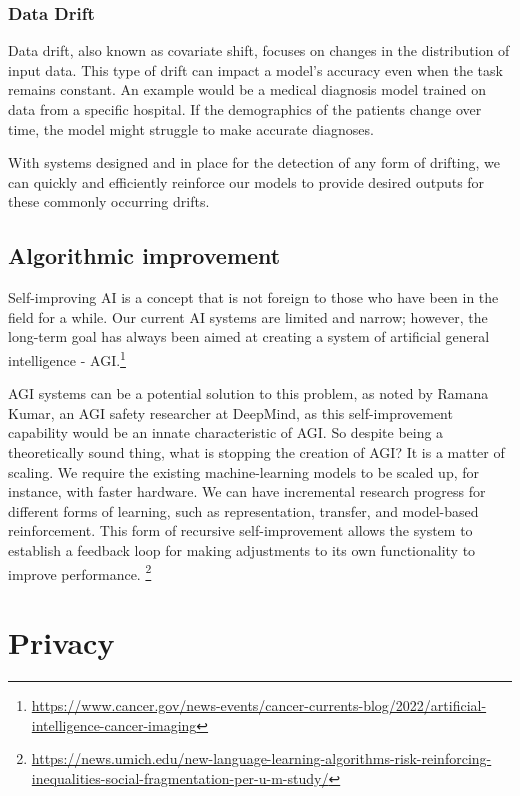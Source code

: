 \documentclass[
]{book}
\begin{document}
\hypertarget{data-drift}{%
\subsection{Data Drift}\label{data-drift}}

Data drift, also known as covariate shift, focuses on changes in the distribution of input data. This type of drift can impact a model's accuracy even when the task remains constant. An example would be a medical diagnosis model trained on data from a specific hospital. If the demographics of the patients change over time, the model might struggle to make accurate diagnoses.

With systems designed and in place for the detection of any form of drifting, we can quickly and efficiently reinforce our models to provide desired outputs for these commonly occurring drifts.

\hypertarget{algorithmic-improvement}{%
\section{Algorithmic improvement}\label{algorithmic-improvement}}

Self-improving AI is a concept that is not foreign to those who have been in the field for a while. Our current AI systems are limited and narrow; however, the long-term goal has always been aimed at creating a system of artificial general intelligence - AGI.\footnote{\url{https://www.cancer.gov/news-events/cancer-currents-blog/2022/artificial-intelligence-cancer-imaging}}

AGI systems can be a potential solution to this problem, as noted by Ramana Kumar, an AGI safety researcher at DeepMind, as this self-improvement capability would be an innate characteristic of AGI. So despite being a theoretically sound thing, what is stopping the creation of AGI? It is a matter of scaling.
We require the existing machine-learning models to be scaled up, for instance, with faster hardware. We can have incremental research progress for different forms of learning, such as representation, transfer, and model-based reinforcement. This form of recursive self-improvement allows the system to establish a feedback loop for making adjustments to its own functionality to improve performance. \footnote{\url{https://news.umich.edu/new-language-learning-algorithms-risk-reinforcing-inequalities-social-fragmentation-per-u-m-study/}}

\hypertarget{privacy}{%
\chapter{Privacy}\label{privacy}}
\end{document}
